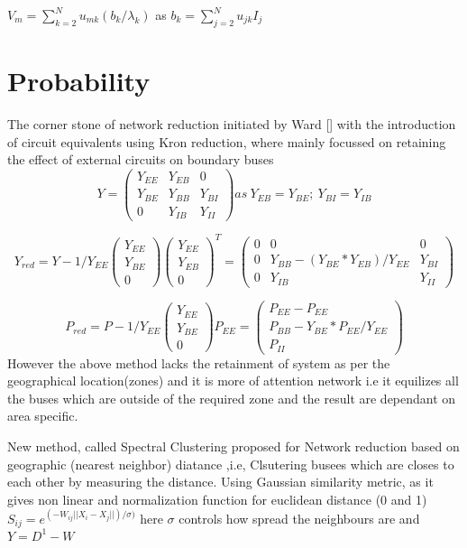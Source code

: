 \documentclass[12pt]{article}
\begin{document}
\begin{center} $V_m=\sum_{k=2}^N u_{mk}(b_{k}/\lambda_{k}) $  as $ b_k=\sum_{j=2}^N u_{jk}I_{j}$ \end{center}

\section{Probability}

The corner stone of network reduction initiated  by Ward [] with the introduction of circuit equivalents using Kron reduction, where mainly focussed on retaining the effect of external circuits on boundary buses
\[Y
=
\begin{pmatrix} 
Y_{EE} & Y_{EB} & 0 \\
Y_{BE} &  Y_{BB}&  Y_{BI}\\
0 & Y_{IB} & Y_{II}
\end{pmatrix}
as \ Y_{EB}=Y_{BE} ;\ Y_{BI}=Y_{IB}
\]

\[Y_{red}
=Y-1/Y_{EE}
\begin{pmatrix} 
Y_{EE}  \\
Y_{BE}\\
0
\end{pmatrix}
\begin{pmatrix} 
Y_{EE}  \\
Y_{EB}\\
0
\end{pmatrix}^T
=
\begin{pmatrix} 
0 & 0 & 0 \\
0 &  Y_{BB}-(Y_{BE}*Y_{EB})/Y_{EE} &  Y_{BI}\\
0 & Y_{IB} & Y_{II}
\end{pmatrix}
\]

\[P_{red}
=P-1/Y_{EE}
\begin{pmatrix} 
Y_{EE}  \\
Y_{BE}\\
0
\end{pmatrix}
P_{EE}
=
\begin{pmatrix}
P_{EE}-P_{EE}\\
P_{BB}-Y_{BE}*P_{EE}/Y_{EE}\\
P_{II}
\end{pmatrix}
\]
However the above method lacks the retainment of system as per the geographical location(zones) and it is more of attention network i.e it equilizes all the buses which are outside of the required zone and the result are dependant on area specific.

New method, called Spectral Clustering proposed for Network reduction based on geographic (nearest neighbor) diatance ,i.e, Clsutering busees which are closes to each other by measuring the distance. Using Gaussian similarity metric, as it gives non linear and normalization function for euclidean distance  (0 and 1)  $S_{ij}=e^{(-W_{ij}||X_{i}-X_{j}||)/\sigma)}$ here $\sigma$ controls how spread the neighbours are and $Y=D^1-W$
\end{document}

